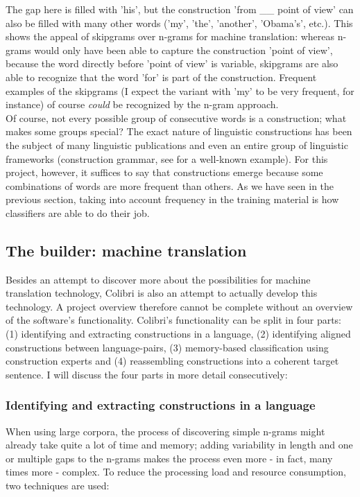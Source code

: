 \documentclass[12pt]{article}
\begin{document}
The gap here is filled with 'his', but the construction 'from \_\_ point of view' can also be filled with many other words ('my', 'the', 'another', 'Obama's', etc.). This shows the appeal of skipgrams over n-grams for machine translation: whereas n-grams would only have been able to capture the construction 'point of view', because the word directly before 'point of view' is variable, skipgrams are also able to recognize that the word 'for' is part of the construction. Frequent examples of the skipgrams (I expect the variant with 'my' to be very frequent, for instance) of course \emph{could} be recognized by the n-gram approach.\\\indent
Of course, not every possible group of consecutive words is a construction; what makes some groups special? The exact nature of linguistic constructions has been the subject of many linguistic publications and even an entire group of linguistic frameworks (construction grammar, see \citet{goldberg95} for a well-known example). For this project, however, it suffices to say that constructions emerge because some combinations of words are more frequent than others. As we have seen in the previous section, taking into account frequency in the training material is how classifiers are able to do their job.

\subsection{The builder: machine translation} \label{builder}
Besides an attempt to discover more about the possibilities for machine translation technology, Colibri is also an attempt to actually develop this technology. A project overview therefore cannot be complete without an overview of the software's functionality. Colibri's functionality can be split in four parts: (1) identifying and extracting constructions in a language, (2) identifying aligned constructions between language-pairs, (3) memory-based classification using construction experts and (4) reassembling constructions into a coherent target sentence. I will discuss the four parts in more detail consecutively:

\subsubsection{Identifying and extracting constructions in a language}
When using large corpora, the process of discovering simple n-grams might already take quite a lot of time and memory; adding variability in length and one or multiple gaps to the n-grams makes the process even more - in fact, many times more - complex. To reduce the processing load and resource consumption, two techniques are used:
\end{document}
